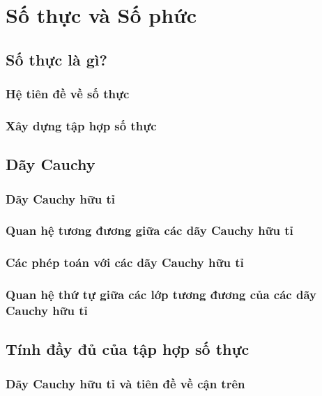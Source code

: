 \chapter{Số thực và Số phức}\label{chapter:real-numbers-and-complex-numbers}

\section{Số thực là gì?}

\subsection*{Hệ tiên đề về số thực}

\subsection*{Xây dựng tập hợp số thực}

\section{Dãy Cauchy}

\subsection*{Dãy Cauchy hữu tỉ}

\subsection*{Quan hệ tương đương giữa các dãy Cauchy hữu tỉ}

\subsection*{Các phép toán với các dãy Cauchy hữu tỉ}

\subsection*{Quan hệ thứ tự giữa các lớp tương đương của các dãy Cauchy hữu tỉ}

\section{Tính đầy đủ của tập hợp số thực}

\subsection*{Dãy Cauchy hữu tỉ và tiên đề về cận trên}

